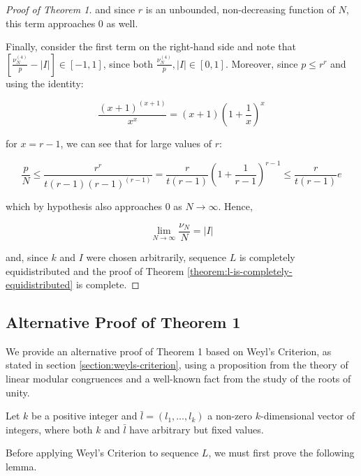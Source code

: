 \documentclass[11pt,a4paper]{tesis}
\theoremstyle{plain}
\theoremstyle{definition}
\begin{document}
\begin{proof}[Proof of Theorem 1]
  and since $r$ is an unbounded, non-decreasing function of $N$, this term approaches $0$ as well.

  Finally, consider the first term on the right-hand side and note that $\left[ \frac{\nu^{(4)}_N}{p} - |I| \right] \in [-1, 1]$, since both $\frac{\nu^{(4)}_N}{p}, |I| \in [0, 1]$. Moreover, since $p \le r^r$ and using the identity:

  \begin{equation*}
    \frac{(x + 1)^{(x + 1)}}{x^x} = (x + 1) \left(1 + \frac{1}{x} \right)^x
  \end{equation*}

  for $x = r - 1$, we can see that for large values of $r$:

  \begin{equation*}
    \frac{p}{N} \le \frac{r^r}{t(r - 1) (r - 1)^{(r - 1)}} = \frac{r}{t(r - 1)} \left( 1 + \frac{1}{r - 1} \right)^{r - 1} \le \frac{r}{t(r - 1)} e
  \end{equation*}

  which by hypothesis also approaches $0$ as $N \to \infty$. Hence,

  \begin{equation*}
    \lim_{N \to \infty} \frac{\nu_N}{N} = |I|
  \end{equation*}

  and, since $k$ and $I$ were chosen arbitrarily, sequence $L$ is completely equidistributed and the proof of Theorem \ref{theorem:l-is-completely-equidistributed} is complete.

\end{proof}

\subsection{Alternative Proof of Theorem 1}

We provide an alternative proof of Theorem 1 based on Weyl's Criterion, as stated in section \ref{section:weyls-criterion}, using a proposition from the theory of linear modular congruences and a well-known fact from the study of the roots of unity.

Let $k$ be a positive integer and $\bar{l} = (l_1, \dots, l_k)$ a non-zero $k$-dimensional vector of integers, where both $k$ and $\bar{l}$ have arbitrary but fixed values.

Before applying Weyl's Criterion to sequence $L$, we must first prove the following lemma.
\end{document}
